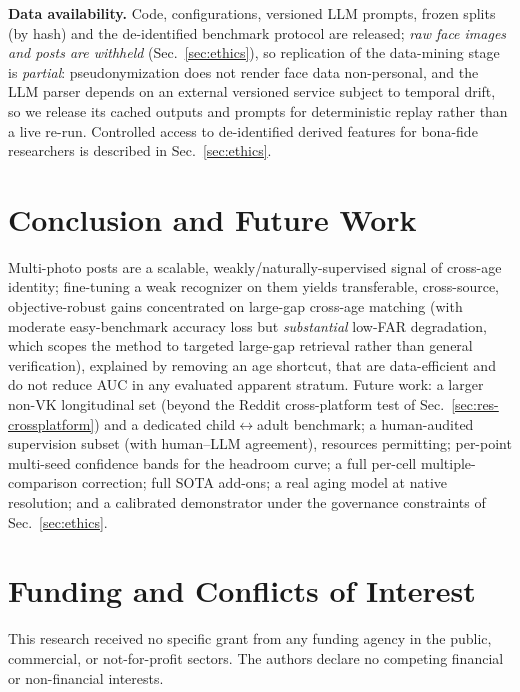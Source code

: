 \documentclass[journal]{IEEEtran}
\begin{document}
\textbf{Data availability.} Code, configurations, versioned LLM prompts, frozen splits (by hash) and the de-identified benchmark protocol are released; \emph{raw face images and posts are withheld} (Sec.~\ref{sec:ethics}), so replication of the data-mining stage is \emph{partial}: pseudonymization does not render face data non-personal, and the LLM parser depends on an external versioned service subject to temporal drift, so we release its cached outputs and prompts for deterministic replay rather than a live re-run. Controlled access to de-identified derived features for bona-fide researchers is described in Sec.~\ref{sec:ethics}.

\section{Conclusion and Future Work}\label{sec:conclusion}
Multi-photo posts are a scalable, weakly/naturally-supervised signal of cross-age identity; fine-tuning a weak recognizer on them yields transferable, cross-source, objective-robust gains concentrated on large-gap cross-age matching (with moderate easy-benchmark accuracy loss but \emph{substantial} low-FAR degradation, which scopes the method to targeted large-gap retrieval rather than general verification), explained by removing an age shortcut, that are data-efficient and do not reduce AUC in any evaluated apparent stratum. Future work: a larger non-VK longitudinal set (beyond the Reddit cross-platform test of Sec.~\ref{sec:res-crossplatform}) and a dedicated child$\leftrightarrow$adult benchmark; a human-audited supervision subset (with human--LLM agreement), resources permitting; per-point multi-seed confidence bands for the headroom curve; a full per-cell multiple-comparison correction; full SOTA add-ons; a real aging model at native resolution; and a calibrated demonstrator under the governance constraints of Sec.~\ref{sec:ethics}.

\section*{Funding and Conflicts of Interest}
This research received no specific grant from any funding agency in the public, commercial, or not-for-profit sectors. The authors declare no competing financial or non-financial interests.



\end{document}
